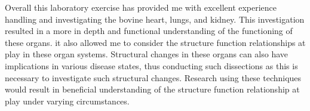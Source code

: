 \documentclass[12pt]{article}
\begin{document}
\par{}
Overall this laboratory exercise has provided me with excellent experience handling and investigating the bovine heart, lungs, and kidney. This investigation resulted in a more in depth and functional understanding of the functioning of these organs. it also allowed me to consider the structure function relationships at play in these organ systems. Structural changes in these organs can also have implications in various disease states, thus conducting such dissections as this is necessary to investigate such structural changes. Research using these techniques would result in beneficial understanding of the structure function relationship at play under varying circumstances. 




\end{document}
